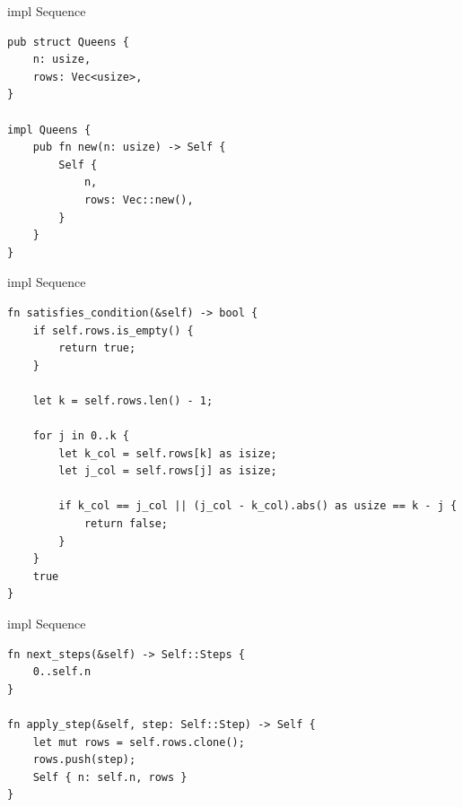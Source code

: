 \documentclass[aspectratio=43,t]{beamer}
\begin{document}
    \begin{frame}[fragile]{impl Sequence}
      \begin{verbatim}
pub struct Queens {
    n: usize,
    rows: Vec<usize>,
}

impl Queens {
    pub fn new(n: usize) -> Self {
        Self {
            n,
            rows: Vec::new(),
        }
    }
}
      \end{verbatim}
    \end{frame}
    \begin{frame}[fragile]{impl Sequence}
\begin{verbatim}
fn satisfies_condition(&self) -> bool {
    if self.rows.is_empty() {
        return true;
    }

    let k = self.rows.len() - 1;

    for j in 0..k {
        let k_col = self.rows[k] as isize;
        let j_col = self.rows[j] as isize;

        if k_col == j_col || (j_col - k_col).abs() as usize == k - j {
            return false;
        }
    }
    true
}
\end{verbatim}
    \end{frame}
    \begin{frame}[fragile]{impl Sequence}
\begin{verbatim}
fn next_steps(&self) -> Self::Steps {
    0..self.n
}

fn apply_step(&self, step: Self::Step) -> Self {
    let mut rows = self.rows.clone();
    rows.push(step);
    Self { n: self.n, rows }
}
\end{verbatim}
    \end{frame}
\end{document}
